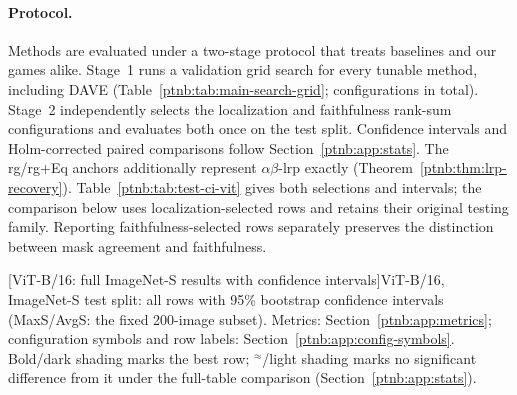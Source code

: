 \paragraph{Protocol.}
Methods are evaluated under a two-stage protocol that treats baselines and our games alike. Stage~1 runs a validation grid search for every tunable method, including DAVE (Table~\ref{ptnb:tab:main-search-grid}; \nValGrid{} configurations in total). Stage~2 independently selects the localization and faithfulness rank-sum configurations and evaluates both once on the test split. Confidence intervals and Holm-corrected paired comparisons follow Section~\ref{ptnb:app:stats}. The \ac{rg}/\ac{rg}+Eq anchors additionally represent $\alpha\beta$-\ac{lrp} exactly (Theorem~\ref{ptnb:thm:lrp-recovery}). Table~\ref{ptnb:tab:test-ci-vit} gives both selections and intervals; the comparison below uses localization-selected rows and retains their original testing family. Reporting faithfulness-selected rows separately preserves the distinction between mask agreement and faithfulness.

\begin{center}
    \captionsetup{hypcap=false}
    [ViT-B/16: full ImageNet-S results with confidence intervals]{ViT-B/16, ImageNet-S test split: all rows with 95\% bootstrap confidence
    intervals (MaxS/AvgS: the fixed 200-image subset). Metrics: Section~\ref{ptnb:app:metrics}; configuration symbols and row labels:
    Section~\ref{ptnb:app:config-symbols}. Bold/dark shading marks the best row; $^{\approx}$/light shading marks no significant difference from it under the full-table comparison (Section~\ref{ptnb:app:stats}).}
    \label{ptnb:tab:test-ci-vit}\label{ptnb:tab:eval-vit}\label{tab:eval-vit}
\end{center}
\captionsetup{hypcap=true}

